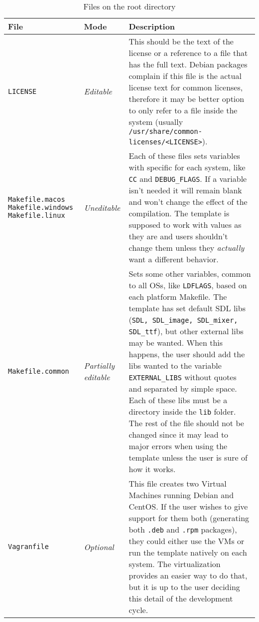 \begin{longtabu} to \linewidth {XlX[2]}

\caption{Files on the root directory}\label{tab:files_root_dir}\\
\toprule
\textbf{File} & \textbf{Mode} & \textbf{Description} \\
\midrule
\endhead



\texttt{LICENSE} & \emph{Editable} & This should be the text of the license or a reference to a file that has the full text. Debian packages complain if this file is the actual license text for common licenses, therefore it may be better option to only refer to a file inside the system (usually \texttt{/usr/share/common-licenses/<LICENSE>}). \\ \hline
\texttt{Makefile.macos} \texttt{Makefile.windows} \texttt{Makefile.linux} & \emph{Uneditable} & Each of these files sets variables with specific for each system, like \texttt{CC} and \texttt{DEBUG\_FLAGS}. If a variable isn't needed it will remain blank and won't change the effect of the compilation. The template is supposed to work with values as they are and users shouldn't change them unless they \emph{actually} want a different behavior. \\ \hline
\texttt{Makefile.common} & \emph{Partially editable} & Sets some other variables, common to all OSs, like \texttt{LDFLAGS}, based on each platform Makefile. The template has set default SDL libs (\texttt{SDL, SDL\_image, SDL\_mixer, SDL\_ttf}), but other external libs may be wanted. When this happens, the user should add the libs wanted to the variable \texttt{EXTERNAL\_LIBS} without quotes and separated by simple space. Each of these libs must be a directory inside the \texttt{lib} folder. The rest of the file should not be changed since it may lead to major errors when using the template unless the user is sure of how it works. \\ \hline
\texttt{Vagranfile} & \emph{Optional} & This file creates two Virtual Machines running Debian and CentOS. If the user wishes to give support for them both (generating both \texttt{.deb} and \texttt{.rpm} packages), they could either use the VMs or run the template natively on each system. The virtualization provides an easier way to do that, but it is up to the user deciding this detail of the development cycle. \\ \hline

\end{longtabu}
